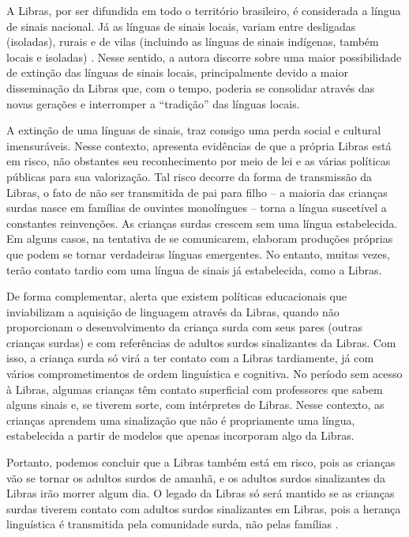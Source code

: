 A Libras, por ser difundida em todo o território brasileiro, é considerada a língua de sinais nacional. Já as línguas de sinais locais, variam entre desligadas (isoladas), rurais e de vilas (incluindo as línguas de sinais indígenas, também locais e isoladas) \cite{Quadros2017,Quadros2019}. Nesse sentido, a autora discorre sobre uma maior possibilidade de extinção das línguas de sinais locais, principalmente devido a maior disseminação da Libras que, com o tempo, poderia se consolidar através das novas gerações e interromper a ``tradição'' das línguas locais.

A extinção de uma línguas de sinais, traz consigo uma perda social e cultural imensuráveis. Nesse contexto,  apresenta evidências de que a própria Libras está em risco, não obstantes seu reconhecimento por meio de lei e as várias políticas públicas para sua valorização. Tal risco decorre da forma de transmissão da Libras, o fato de não ser transmitida de pai para filho -- a maioria das crianças surdas nasce em famílias de ouvintes monolíngues -- torna a língua suscetível a constantes reinvenções. As crianças surdas crescem sem uma língua estabelecida. Em alguns casos, na tentativa de se comunicarem, elaboram produções próprias que podem se tornar verdadeiras línguas emergentes. No entanto, muitas vezes, terão contato tardio com uma língua de sinais já estabelecida, como a Libras.

De forma complementar,  alerta que existem políticas educacionais que inviabilizam a aquisição de linguagem através da Libras, quando não proporcionam o desenvolvimento da criança surda com seus pares (outras crianças surdas) e com referências de adultos surdos sinalizantes da Libras. Com isso, a criança surda só virá a ter contato com a Libras tardiamente, já com vários comprometimentos de ordem linguística e cognitiva. No período sem acesso à Libras, algumas crianças têm contato superficial com professores que sabem alguns sinais e, se tiverem sorte, com intérpretes de Libras. Nesse contexto, as crianças aprendem uma sinalização que não é propriamente uma língua, estabelecida a partir de modelos que apenas incorporam algo da Libras.

Portanto, podemos concluir que a Libras também está em risco, pois as crianças vão se tornar os adultos surdos de amanhã, e os adultos surdos sinalizantes da Libras irão morrer algum dia. O legado da Libras só será mantido se as crianças surdas tiverem contato com adultos surdos sinalizantes em Libras, pois a herança linguística é transmitida pela comunidade surda, não pelas famílias \cite{Quadros2019}.

